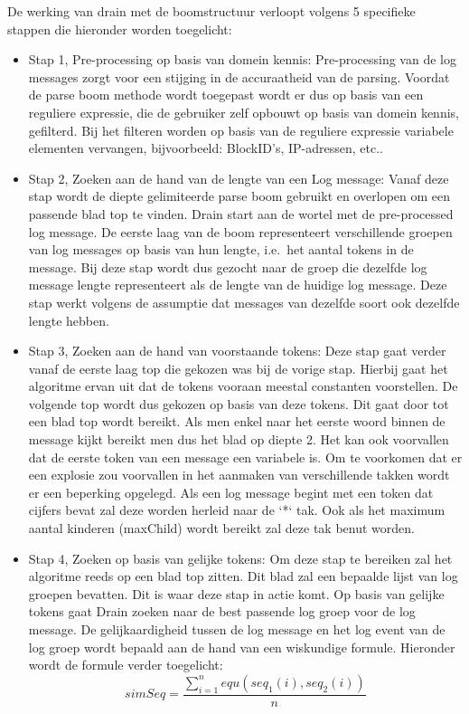 De werking van drain met de boomstructuur verloopt volgens 5 specifieke stappen die hieronder worden toegelicht:
\begin{itemize}
    \item Stap 1, Pre-processing op basis van domein kennis: Pre-processing van de log messages zorgt voor een stijging in de accuraatheid van de parsing. Voordat de parse boom methode wordt toegepast wordt er dus op basis van een reguliere expressie, die de gebruiker zelf opbouwt op basis van domein kennis, gefilterd. Bij het filteren worden op basis van de reguliere expressie variabele elementen vervangen, bijvoorbeeld: BlockID's, IP-adressen, etc.. \\
    \item Stap 2, Zoeken aan de hand van de lengte van een Log message:
    Vanaf deze stap wordt de diepte gelimiteerde parse boom gebruikt en overlopen om een passende blad top te vinden. Drain start aan de wortel met de pre-processed log message. De eerste laag van de boom representeert verschillende groepen van log messages op basis van hun lengte, i.e.\ het aantal tokens in de message. Bij deze stap wordt dus gezocht naar de groep die dezelfde log message lengte representeert als de lengte van de huidige log message. Deze stap werkt volgens de assumptie dat messages van dezelfde soort ook dezelfde lengte hebben. \\
    \item Stap 3, Zoeken aan de hand van voorstaande tokens: 
    Deze stap gaat verder vanaf de eerste laag top die gekozen was bij de vorige stap. Hierbij gaat het algoritme ervan uit dat de tokens vooraan meestal constanten voorstellen. De volgende top wordt dus gekozen op basis van deze tokens. Dit gaat door tot een blad top wordt bereikt. Als men enkel naar het eerste woord binnen de message kijkt bereikt men dus het blad op diepte 2. Het kan ook voorvallen dat de eerste token van een message een variabele is. Om
    te voorkomen dat er een explosie zou voorvallen in het aanmaken van verschillende takken wordt er een beperking opgelegd. Als een log message begint met een token dat cijfers bevat zal deze worden herleid naar de `*` tak. Ook als het maximum aantal kinderen (maxChild) wordt bereikt zal deze tak benut worden. \\
    \item Stap 4, Zoeken op basis van gelijke tokens:
    Om deze stap te bereiken zal het algoritme reeds op een blad top zitten. Dit blad zal een bepaalde lijst van log groepen bevatten. Dit is waar deze stap in actie komt. Op basis van gelijke tokens gaat Drain zoeken naar de best passende log groep voor de log message. De gelijkaardigheid tussen de log message en het log event van de log groep wordt bepaald aan de hand van een wiskundige formule. Hieronder wordt de formule verder toegelicht:\\
    \[ simSeq = \frac{\sum_{i=1}^{n}equ(seq_{1}(i), seq_{2}(i))}{n} \]


\end{itemize}
